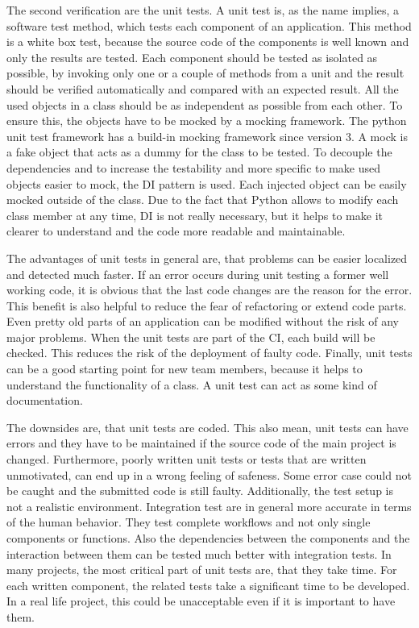 The second verification are the unit tests.
A unit test is, as the name implies, a software test method, which tests each component of an application.
This method is a white box test, because the source code of the components is well known and only the results are tested.
Each component should be tested as isolated as possible, by invoking only one or a couple of methods from a unit and the result should be verified automatically and compared with an expected result.\autocite[cf.][p. 320]{Olan:2003:UTT}
All the used objects in a class should be as independent as possible from each other.
To ensure this, the objects have to be mocked by a mocking framework.
The python unit test framework has a build-in mocking framework since version 3.
A mock is a fake object that acts as a dummy for the class to be tested.
To decouple the dependencies and to increase the testability and more specific to make used objects easier to mock, the \ac{DI} pattern is used.
Each injected object can be easily mocked outside of the class.
Due to the fact that Python allows to modify each class member at any time, \ac{DI} is not really necessary, but it helps to make it clearer to understand and the code more readable and maintainable.\newline

The advantages of unit tests in general are, that problems can be easier localized and detected much faster.
If an error occurs during unit testing a former well working code, it is obvious that the last code changes are the reason for the error.
This benefit is also helpful to reduce the fear of refactoring or extend code parts.
Even pretty old parts of an application can be modified without the risk of any major problems.
When the unit tests are part of the \ac{CI}, each build will be checked.
This reduces the risk of the deployment of faulty code.
Finally, unit tests can be a good starting point for new team members, because it helps to understand the functionality of a class.
A unit test can act as some kind of documentation.\newline

The downsides are, that unit tests are coded.
This also mean, unit tests can have errors and they have to be maintained if the source code of the main project is changed.
Furthermore, poorly written unit tests or tests that are written unmotivated, can end up in a wrong feeling of safeness.
Some error case could not be caught and the submitted code is still faulty.
Additionally, the test setup is not a realistic environment.
Integration test are in general more accurate in terms of the human behavior.
They test complete workflows and not only single components or functions.
Also the dependencies between the components and the interaction between them can be tested much better with integration tests.
In many projects, the most critical part of unit tests are, that they take time.
For each written component, the related tests take a significant time to be developed.
In a real life project, this could be unacceptable even if it is important to have them.\newline

